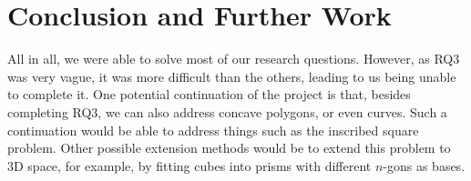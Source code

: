 \documentclass[12pt]{scrartcl}
\begin{document}
\section{Conclusion and Further Work}
All in all, we were able to solve most of our research questions. However, as RQ3 was very vague, it was more difficult than the others, leading to us being unable to complete it. One potential continuation of the project is that, besides completing RQ3, we can also address concave polygons, or even curves. Such a continuation would be able to address things such as the inscribed square problem. Other possible extension methods would be to extend this problem to 3D space, for example, by fitting cubes into prisms with different $n$-gons as bases.   

\printbibliography
\end{document}
